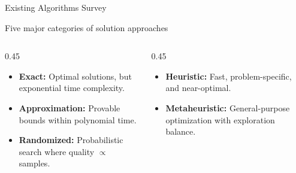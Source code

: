 \documentclass[aspectratio=169,10pt]{beamer}
\begin{document}
\begin{frame}{Existing Algorithms Survey}
    \centering
    \begin{tcolorbox}[colback=TealLight!30, colframe=TealMain, arc=0mm, leftrule=5mm,
      title=\textbf{Comprehensive Algorithm Categories for WTA}]
        \centering \small Five major categories of solution approaches
    \end{tcolorbox}

    \vspace{0.2cm}
    \begin{columns}[t]
        \begin{column}{0.45\textwidth}
            \begin{itemize}
                \item[\color{goldaccent}$\blacktriangleright$] \textbf{\color{TealMain}Exact:} Optimal solutions, but exponential time complexity.
                \item[\color{goldaccent}$\blacktriangleright$] \textbf{\color{TealMain}Approximation:} Provable bounds within polynomial time.
                \item[\color{goldaccent}$\blacktriangleright$] \textbf{\color{TealMain}Randomized:} Probabilistic search where quality $\propto$ samples.
            \end{itemize}
        \end{column}
        \begin{column}{0.45\textwidth}
            \begin{itemize}
                \item[\color{goldaccent}$\blacktriangleright$] \textbf{\color{TealMain}Heuristic:} Fast, problem-specific, and near-optimal.
                \item[\color{goldaccent}$\blacktriangleright$] \textbf{\color{TealMain}Metaheuristic:} General-purpose optimization with exploration balance.
            \end{itemize}
        \end{column}
    \end{columns}
\end{frame}
\end{document}
